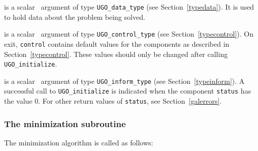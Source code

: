 \documentclass{galahad}
\newcommand{\packagename}{UGO}
\begin{document}
\vspace*{-2mm}
\begin{description}

 is a scalar \intentinout\ argument of type
{\tt \packagename\_data\_type}
(see Section~\ref{typedata}). It is used to hold data about the problem being
solved.

 is a scalar \intentout\ argument of type
{\tt \packagename\_control\_type}
(see Section~\ref{typecontrol}).
On exit, {\tt control} contains default values for the components as
described in Section~\ref{typecontrol}.
These values should only be changed after calling
{\tt \packagename\_initialize}.

 is a scalar \intentout\ argument of type
{\tt \packagename\_inform\_type}
(see Section~\ref{typeinform}). A successful call to
{\tt \packagename\_initialize}
is indicated when the  component {\tt status} has the value 0.
For other return values of {\tt status}, see Section~\ref{galerrors}.

\end{description}


\subsubsection{The minimization subroutine}
The minimization algorithm is called as follows:
\vspace*{1mm}
\end{document}
